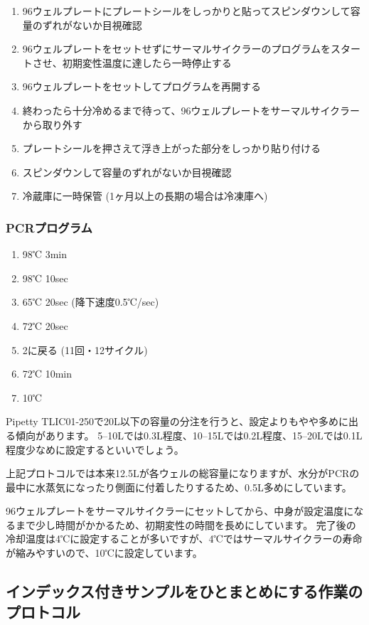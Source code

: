\documentclass[titlepage,10pt,a4paper,uplatex]{jsbook}
\begin{document}
\begin{enumerate}
\item 96ウェルプレートにプレートシールをしっかりと貼ってスピンダウンして容量のずれがないか目視確認
\item 96ウェルプレートをセットせずにサーマルサイクラーのプログラムをスタートさせ、初期変性温度に達したら一時停止する
\item 96ウェルプレートをセットしてプログラムを再開する
\item 終わったら十分冷めるまで待って、96ウェルプレートをサーマルサイクラーから取り外す
\item プレートシールを押さえて浮き上がった部分をしっかり貼り付ける
\item スピンダウンして容量のずれがないか目視確認
\item 冷蔵庫に一時保管 (1ヶ月以上の長期の場合は冷凍庫へ)
\end{enumerate}

\subsubsection{PCRプログラム}
\begin{enumerate}
\item 98℃ 3min
\item 98℃ 10sec
\item 65℃ 20sec (降下速度0.5℃/sec)
\item 72℃ 20sec
\item 2に戻る (11回・12サイクル)
\item 72℃ 10min
\item 10℃
\end{enumerate}

Pipetty TLIC01-250で20{\textmu}L以下の容量の分注を行うと、設定よりもやや多めに出る傾向があります。
5--10{\textmu}Lでは0.3{\textmu}L程度、10--15{\textmu}Lでは0.2{\textmu}L程度、15--20{\textmu}Lでは0.1{\textmu}L程度少なめに設定するといいでしょう。

上記プロトコルでは本来12.5{\textmu}Lが各ウェルの総容量になりますが、水分がPCRの最中に水蒸気になったり側面に付着したりするため、0.5{\textmu}L多めにしています。

96ウェルプレートをサーマルサイクラーにセットしてから、中身が設定温度になるまで少し時間がかかるため、初期変性の時間を長めにしています。
完了後の冷却温度は4℃に設定することが多いですが、4℃ではサーマルサイクラーの寿命が縮みやすいので、10℃に設定しています。

\subsection{インデックス付きサンプルをひとまとめにする作業のプロトコル}
\end{document}
